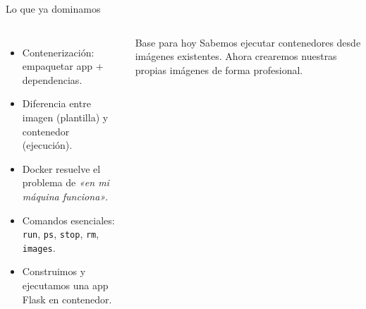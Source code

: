 \documentclass[aspectratio=169]{beamer}
\begin{document}
\begin{frame}{Lo que ya dominamos}
  \begin{columns}[c]
    \footnotesize
    \begin{itemize}
      \item Contenerización: empaquetar app + dependencias.
      \item Diferencia entre imagen (plantilla) y contenedor (ejecución).
      \item Docker resuelve el problema de \textit{«en mi máquina funciona»}.
      \item Comandos esenciales: \texttt{run}, \texttt{ps}, \texttt{stop}, \texttt{rm}, \texttt{images}.
      \item Construimos y ejecutamos una app Flask en contenedor.
    \end{itemize}
    \begin{exampleblock}{Base para hoy}
      Sabemos ejecutar contenedores desde imágenes existentes. Ahora crearemos nuestras propias imágenes de forma profesional.
    \end{exampleblock}
    \centering
  \end{columns}
\end{frame}
\end{document}
